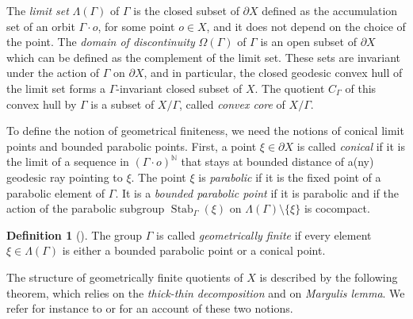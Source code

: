 \documentclass{article}
\theoremstyle{definition}
\newtheorem*{definition}{Definition}
\theoremstyle{remark}
\newcommand{\N}{\mathbb{N}}
\begin{document}
	
The \textit{limit set} $\Lambda(\Gamma)$ of $\Gamma$ is the closed subset of $\partial X$ defined as the accumulation set of an orbit $\Gamma \cdot o$, for some point $o\in X$, and it does not depend on the choice of the point. The \textit{domain of discontinuity} $\Omega(\Gamma)$ of $\Gamma$ is an open subset of $\partial X$ which can be defined as the complement of the limit set. These sets are invariant under the action of $\Gamma$ on $\partial X$, and in particular, the closed geodesic convex hull of the limit set forms a $\Gamma$-invariant closed subset of $X$. The quotient $C_{\Gamma}$ of this convex hull by $\Gamma$ is a subset of $X/\Gamma$, called \textit{convex core} of $X/\Gamma$.

To define the notion of geometrical finiteness, we need the notions of conical limit points and bounded parabolic points. First, a point $\xi\in \partial X$ is called \textit{conical} if it is the limit of a sequence in $(\Gamma \cdot o)^{\N}$ that stays at bounded distance of a(ny) geodesic ray pointing to $\xi$. The point $\xi$ is \textit{parabolic} if it is the fixed point of a parabolic element of $\Gamma$. It is a \textit{bounded parabolic point} if it is parabolic and if the action of the parabolic subgroup $\operatorname{Stab}_{\Gamma}(\xi)$ on $\Lambda(\Gamma)\setminus\{\xi\}$ is cocompact.

\begin{definition}[{\cite[Definition F2]{bowditchGeometricalFinitenessVariable1995}}]
	The group $\Gamma$ is called \textit{geometrically finite} if every element $\xi\in\Lambda(\Gamma)$ is either a bounded parabolic point or a conical point.
\end{definition}

The structure of geometrically finite quotients of $X$ is described by the following theorem, which relies on the \textit{thick-thin decomposition} and on \textit{Margulis lemma}. We refer for instance to \cite[Chapter D]{benedettiLecturesHyperbolicGeometry1992} or \cite[Section 3.5]{bowditchGeometricalFinitenessVariable1995} for an account of these two notions.
\end{document}
